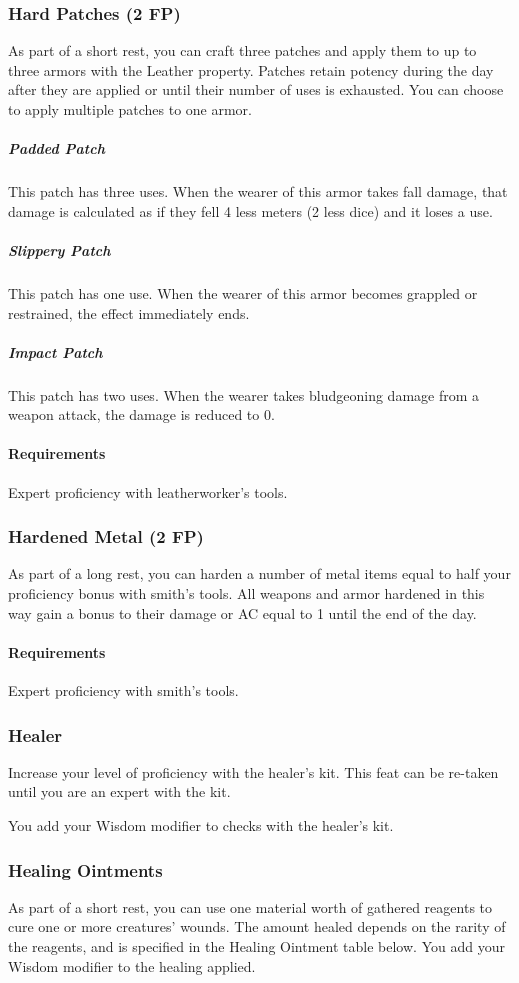 \subsubsection{Hard Patches (2 FP)} \label{feat::hardpatches}
    As part of a short rest, you can craft three patches and apply them to up to three armors with the Leather property.
    Patches retain potency during the day after they are applied or until their number of uses is exhausted.
    You can choose to apply multiple patches to one armor.
    \subparagraph{Padded Patch} This patch has three uses.
    When the wearer of this armor takes fall damage, that damage is calculated as if they fell 4 less meters (2 less dice) and it loses a use.
    \subparagraph{Slippery Patch} This patch has one use.
    When the wearer of this armor becomes grappled or restrained, the effect immediately ends.
    \subparagraph{Impact Patch} This patch has two uses.
    When the wearer takes bludgeoning damage from a weapon attack, the damage is reduced to 0.
    \paragraph{Requirements} Expert proficiency with leatherworker's tools.
\subsubsection{Hardened Metal (2 FP)} \label{feat::hardenedmetal}
    As part of a long rest, you can harden a number of metal items equal to half your proficiency bonus with smith's tools.
    All weapons and armor hardened in this way gain a bonus to their damage or AC equal to 1 until the end of the day.
    \paragraph{Requirements} Expert proficiency with smith's tools.
\subsubsection{Healer} \label{feat::healer}
    Increase your level of proficiency with the healer's kit.
    This feat can be re-taken until you are an expert with the kit.

    You add your Wisdom modifier to checks with the healer's kit.
\subsubsection{Healing Ointments} \label{feat::healingoinments}
    As part of a short rest, you can use one material worth of gathered reagents to cure one or more creatures' wounds.
    The amount healed depends on the rarity of the reagents, and is specified in the Healing Ointment table below.
    You add your Wisdom modifier to the healing applied.

